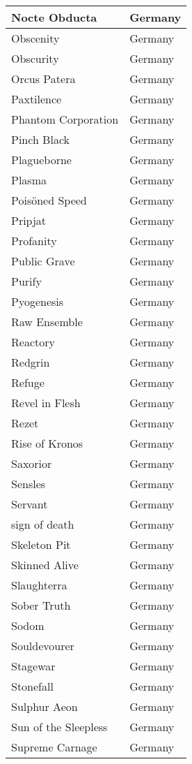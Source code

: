 \documentclass[12pt, a4paper, twoside]{report}
\begin{document}
\begin{center}
\begin{longtable}{|p{5cm}|p{5cm}|}
Nocte Obducta & Germany \\ \hline
Obscenity & Germany \\ \hline
Obscurity & Germany \\ \hline
Orcus Patera & Germany \\ \hline
Paxtilence & Germany \\ \hline
Phantom Corporation & Germany \\ \hline
Pinch Black & Germany \\ \hline
Plagueborne & Germany \\ \hline
Plasma & Germany \\ \hline
Poisöned Speed & Germany \\ \hline
Pripjat & Germany \\ \hline
Profanity & Germany \\ \hline
Public Grave & Germany \\ \hline
Purify & Germany \\ \hline
Pyogenesis & Germany \\ \hline
Raw Ensemble & Germany \\ \hline
Reactory & Germany \\ \hline
Redgrin & Germany \\ \hline
Refuge & Germany \\ \hline
Revel in Flesh & Germany \\ \hline
Rezet & Germany \\ \hline
Rise of Kronos & Germany \\ \hline
Saxorior & Germany \\ \hline
Sensles & Germany \\ \hline
Servant & Germany \\ \hline
sign of death & Germany \\ \hline
Skeleton Pit & Germany \\ \hline
Skinned Alive & Germany \\ \hline
Slaughterra & Germany \\ \hline
Sober Truth & Germany \\ \hline
Sodom & Germany \\ \hline
Souldevourer & Germany \\ \hline
Stagewar & Germany \\ \hline
Stonefall & Germany \\ \hline
Sulphur Aeon & Germany \\ \hline
Sun of the Sleepless & Germany \\ \hline
Supreme Carnage & Germany \\ \hline

\end{longtable}
\end{center}
\end{document}
